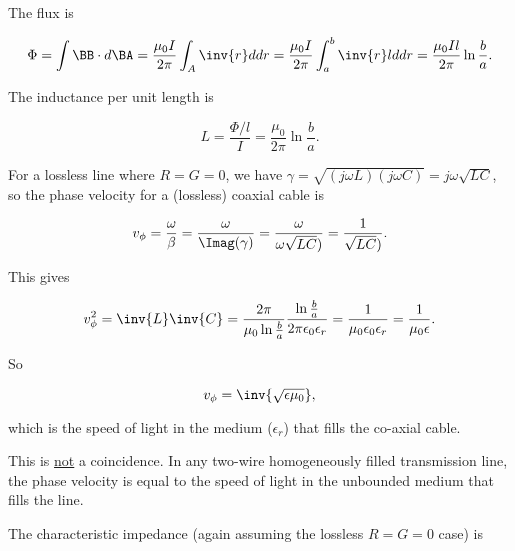{The flux is

\begin{dmath}\label{eqn:uwaves4TransmissionLines:400}
\Phi
= \int \BB \cdot d\BA
= \frac{\mu_0 I}{ 2 \pi } \int_A \inv{r} d dr
= \frac{\mu_0 I}{ 2 \pi } \int_a^b \inv{r} l d dr
= \frac{\mu_0 I l}{ 2 \pi } \ln \frac{b}{a}.
\end{dmath}

The inductance per unit length is

\begin{equation}\label{eqn:uwaves4TransmissionLines:420}
L = \frac{\Phi/l}{I} = \frac{\mu_0}{ 2 \pi } \ln \frac{b}{a}.
\end{equation}


For a lossless line where \( R = G = 0 \), we have \( \gamma = \sqrt{ (j \omega L)(j \omega C)} = j \omega \sqrt{L C} \),
so the phase velocity for a (lossless) coaxial cable is

\begin{dmath}\label{eqn:uwaves4TransmissionLines:440}
v_\phi
= \frac{\omega}{\beta}
= \frac{\omega}{\Imag(\gamma)}
= \frac{\omega}{\omega \sqrt{LC})}
= \frac{1}{\sqrt{LC})}.
\end{dmath}

This gives

\begin{dmath}\label{eqn:uwaves4TransmissionLines:460}
v_\phi^2
= \inv{ L }  \inv{C}
=
\frac{ 2 \pi }{ \mu_0 \ln \frac{b}{a} }
\frac
{\ln \frac{b}{a}}
{2 \pi \epsilon_0 \epsilon_r }
=
\frac{1 }{ \mu_0 \epsilon_0 \epsilon_r }
=
\frac{1 }{ \mu_0 \epsilon }.
\end{dmath}

So

\begin{dmath}\label{eqn:uwaves4TransmissionLines:480}
v_\phi = \inv{\sqrt{\epsilon \mu_0}},
\end{dmath}

which is the speed of light in the medium (\(\epsilon_r\)) that fills the co-axial cable.

This is \underline{not} a coincidence.  In any two-wire homogeneously filled transmission line, the phase velocity is equal to the speed of light in the unbounded medium that fills the line.

The characteristic impedance (again assuming the lossless \( R = G = 0 \) case) is

}

